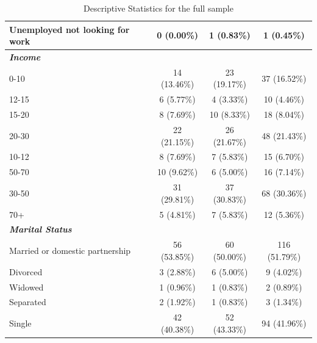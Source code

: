 \documentclass[11pt,a4paper,oneside]{article}
\begin{document}
\begin{table}[!htbp]
{\begin{tabular}{@{}lccc@{}}
Unemployed not looking for work  & 0 (0.00\%)    & 1 (0.83\%)    & 1 (0.45\%)    \\ \hline
\textit{\textbf{Income}}         &               &               &               \\
0-10                             & 14 (13.46\%)  & 23 (19.17\%)  & 37 (16.52\%)  \\
12-15                            & 6 (5.77\%)    & 4 (3.33\%)    & 10 (4.46\%)   \\
15-20                            & 8 (7.69\%)    & 10 (8.33\%)   & 18 (8.04\%)   \\
20-30                            & 22 (21.15\%)  & 26 (21.67\%)  & 48 (21.43\%)  \\
10-12                            & 8 (7.69\%)    & 7 (5.83\%)    & 15 (6.70\%)   \\
50-70                            & 10 (9.62\%)   & 6 (5.00\%)    & 16 (7.14\%)   \\
30-50                            & 31 (29.81\%)  & 37 (30.83\%)  & 68 (30.36\%)  \\
70+                              & 5 (4.81\%)    & 7 (5.83\%)    & 12 (5.36\%)   \\ \hline
\textit{\textbf{Marital Status}} &               &               &               \\
Married or domestic partnership &
  56 (53.85\%) &
  60 (50.00\%) &
  116 (51.79\%) \\
Divorced                         & 3 (2.88\%)    & 6 (5.00\%)    & 9 (4.02\%)    \\
Widowed                          & 1 (0.96\%)    & 1 (0.83\%)    & 2 (0.89\%)    \\
Separated                        & 2 (1.92\%)    & 1 (0.83\%)    & 3 (1.34\%)    \\
Single                           & 42 (40.38\%)  & 52 (43.33\%)  & 94 (41.96\%)  \\ \bottomrule
\end{tabular}%
}
\caption{Descriptive Statistics for the full sample}
\label{table2}
\end{table}
\end{document}
